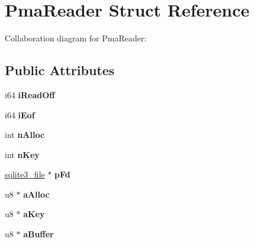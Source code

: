 \hypertarget{struct_pma_reader}{\section{Pma\+Reader Struct Reference}
\label{struct_pma_reader}
}


Collaboration diagram for Pma\+Reader\+:
\subsection*{Public Attributes}
\begin{DoxyCompactItemize}
\item 
\hypertarget{struct_pma_reader_a04a9b631060dcda1d94eb7b16ef8920e}{i64 {\bfseries i\+Read\+Off}}\label{struct_pma_reader_a04a9b631060dcda1d94eb7b16ef8920e}

\item 
\hypertarget{struct_pma_reader_a7a2e2745d054cd6d86e1ad57d641b657}{i64 {\bfseries i\+Eof}}\label{struct_pma_reader_a7a2e2745d054cd6d86e1ad57d641b657}

\item 
\hypertarget{struct_pma_reader_a82522a9128afb8bfb79b88a7c51726ef}{int {\bfseries n\+Alloc}}\label{struct_pma_reader_a82522a9128afb8bfb79b88a7c51726ef}

\item 
\hypertarget{struct_pma_reader_a02c5dbf65efa252a84259b1ee2a7cd3c}{int {\bfseries n\+Key}}\label{struct_pma_reader_a02c5dbf65efa252a84259b1ee2a7cd3c}

\item 
\hypertarget{struct_pma_reader_a1ae1caa6e4b1900937135aeeaf1336cd}{\hyperlink{structsqlite3__file}{sqlite3\+\_\+file} $\ast$ {\bfseries p\+Fd}}\label{struct_pma_reader_a1ae1caa6e4b1900937135aeeaf1336cd}

\item 
\hypertarget{struct_pma_reader_af8d5ac60d1ba7ff84e84d5eb6aba4447}{u8 $\ast$ {\bfseries a\+Alloc}}\label{struct_pma_reader_af8d5ac60d1ba7ff84e84d5eb6aba4447}

\item 
\hypertarget{struct_pma_reader_af8f5dbc63cbbcbf9ee4c2c462ab1c6ff}{u8 $\ast$ {\bfseries a\+Key}}\label{struct_pma_reader_af8f5dbc63cbbcbf9ee4c2c462ab1c6ff}

\item 
\hypertarget{struct_pma_reader_acd2a7f3e0375a3f8dfa9e565d080e2c2}{u8 $\ast$ {\bfseries a\+Buffer}}\label{struct_pma_reader_acd2a7f3e0375a3f8dfa9e565d080e2c2}


\end{DoxyCompactItemize}
